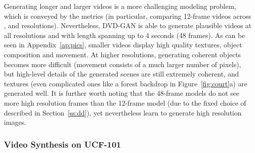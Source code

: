 \documentclass{article} \usepackage{iclr2020_conference,times}
\begin{document}
Generating longer and larger videos is a more challenging modeling problem, which is conveyed by the metrics (in particular, comparing 12-frame videos across ,  and  resolutions). Nevertheless, DVD-GAN is able to generate plausible videos at all resolutions and with length spanning up to 4 seconds (48 frames). As can be seen in Appendix~\ref{ap:pics}, smaller videos display high quality textures, object composition and movement. At higher resolutions, generating coherent objects becomes more difficult (movement consists of a much larger number of pixels), but high-level details of the generated scenes are still extremely coherent, and textures (even complicated ones like a forest backdrop in Figure~\ref{fig:court}a) are generated well. It is further worth noting that the 48-frame models do not see more high resolution frames than the 12-frame model (due to the fixed choice of  described in Section~\ref{ss:dd}), yet nevertheless learn to generate high resolution images.

\subsubsection{Video Synthesis on UCF-101}
\label{ss:ucf_sec}

\begin{figure}[t]
\centering
\begin{floatrow}
\end{floatrow}
\end{figure}
\end{document}

